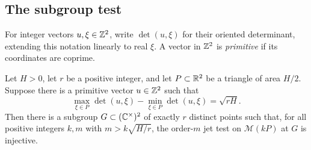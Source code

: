 \subsection{The subgroup test}

For integer vectors $u,\xi\in\mathbb Z^2$, write $\det(u,\xi)$ for their
oriented determinant, extending this notation linearly to real $\xi$.
A vector in $\mathbb Z^2$ is \emph{primitive} if its coordinates are coprime.

\begin{proposition}\label{prop:subgroup-test}
Let $H>0$, let $r$ be a positive integer, and let $P\subset\mathbb R^2$ be a
triangle of area $H/2$.  Suppose there is a primitive vector $u\in\mathbb Z^2$
such that
\[
 \max_{\xi\in P}\det(u,\xi)
 -\min_{\xi\in P}\det(u,\xi)=\sqrt{rH}.
\]
Then there is a subgroup $G\subset(\mathbb C^\times)^2$ of exactly $r$ distinct points
such that, for all positive integers $k,m$ with
$m>k\sqrt{H/r}$, the order-$m$ jet test on $\mathcal M(kP)$ at $G$ is
injective.
\end{proposition}

